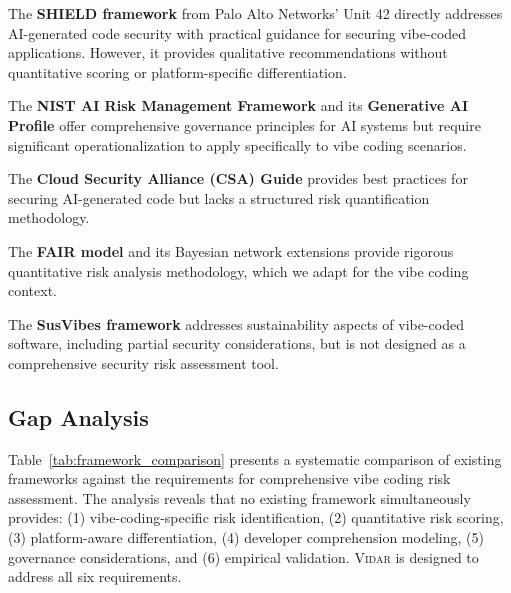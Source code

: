 \documentclass[preprint,review,12pt]{elsarticle}
\newcommand{\vidar}{\textsc{Vidar}}
\begin{document}
The \textbf{SHIELD framework} \cite{unit42shield} from Palo Alto Networks' Unit 42 directly addresses AI-generated code security with practical guidance for securing vibe-coded applications. However, it provides qualitative recommendations without quantitative scoring or platform-specific differentiation.

The \textbf{NIST AI Risk Management Framework} \cite{nist2023ai} and its \textbf{Generative AI Profile} \cite{nist2024genai} offer comprehensive governance principles for AI systems but require significant operationalization to apply specifically to vibe coding scenarios.

The \textbf{Cloud Security Alliance (CSA) Guide} \cite{csa2024ai} provides best practices for securing AI-generated code but lacks a structured risk quantification methodology.

The \textbf{FAIR model} \cite{freund2014measuring} and its Bayesian network extensions \cite{fair2024bn} provide rigorous quantitative risk analysis methodology, which we adapt for the vibe coding context.

The \textbf{SusVibes framework} \cite{alomar2025susvibes} addresses sustainability aspects of vibe-coded software, including partial security considerations, but is not designed as a comprehensive security risk assessment tool.

\subsection{Gap Analysis}
\label{subsec:gap}

Table~\ref{tab:framework_comparison} presents a systematic comparison of existing frameworks against the requirements for comprehensive vibe coding risk assessment. The analysis reveals that no existing framework simultaneously provides: (1) vibe-coding-specific risk identification, (2) quantitative risk scoring, (3) platform-aware differentiation, (4) developer comprehension modeling, (5) governance considerations, and (6) empirical validation. \vidar{} is designed to address all six requirements.
\end{document}
